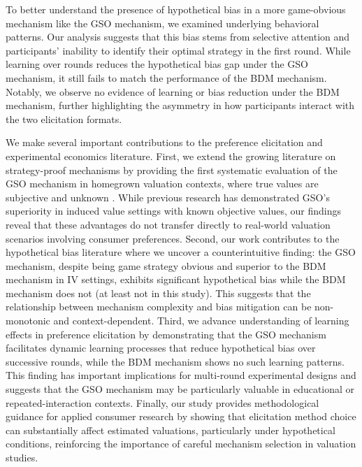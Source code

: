 \documentclass[12pt]{article}
\begin{document}
To better understand the presence of hypothetical bias in a more game-obvious mechanism like the GSO mechanism, we examined underlying behavioral patterns. Our analysis suggests that this bias stems from selective attention and participants’ inability to identify their optimal strategy in the first round. While learning over rounds reduces the hypothetical bias gap under the GSO mechanism, it still fails to match the performance of the BDM mechanism. Notably, we observe no evidence of learning or bias reduction under the BDM mechanism, further highlighting the asymmetry in how participants interact with the two elicitation formats.

We make several important contributions to the preference elicitation and experimental economics literature. First, we extend the growing literature on strategy-proof mechanisms by providing the first systematic evaluation of the GSO mechanism in homegrown valuation contexts, where true values are subjective and unknown \citep{li_obviously_2017, pycia_theory_2023, chakraborty_future_2025}. While previous research has demonstrated GSO's superiority in induced value settings with known objective values, our findings reveal that these advantages do not transfer directly to real-world valuation scenarios involving consumer preferences. Second, our work contributes to the hypothetical bias literature \citep{penn2018understanding, cummings1999unbiased, loomis_whats_2011, fang_use_2021, list2001explicit, grebitus2013explaining} where we uncover a counterintuitive finding: the GSO mechanism, despite being game strategy obvious and superior to the BDM mechanism in IV settings, exhibits significant hypothetical bias while the BDM mechanism does not (at least not in this study). This suggests that the relationship between mechanism complexity and bias mitigation can be non-monotonic and context-dependent. Third, we advance understanding of learning effects in preference elicitation \citep{drichoutis2011role, canavari2019run} by demonstrating that the GSO mechanism facilitates dynamic learning processes that reduce hypothetical bias over successive rounds, while the BDM mechanism shows no such learning patterns. This finding has important implications for multi-round experimental designs and suggests that the 
GSO mechanism may be particularly valuable in educational or repeated-interaction contexts. Finally, our study provides methodological guidance for applied consumer research by showing that elicitation method choice can substantially affect estimated valuations, particularly under hypothetical conditions, reinforcing the importance of careful mechanism selection in valuation studies\citep{miller2011should, schmidt2020accurately}.
\end{document}
